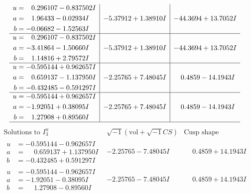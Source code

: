 \documentclass[1p]{elsarticle_modified}
\theoremstyle{definition}
\newcommand{\I}{\sqrt{-1}}
\begin{document}
$$\begin{array}{c|c|c}
\begin{aligned}
u &= \phantom{-}0.296107 - 0.837502 I \\
a &= \phantom{-}1.96433 - 0.02934 I \\
b &= -0.06682 - 1.52563 I\end{aligned}
 & -5.37912 + 1.38910 I & -44.3694 + 13.7052 I \\ \hline\begin{aligned}
u &= \phantom{-}0.296107 - 0.837502 I \\
a &= -3.41864 - 1.50660 I \\
b &= \phantom{-}1.14816 + 2.79572 I\end{aligned}
 & -5.37912 + 1.38910 I & -44.3694 + 13.7052 I \\ \hline\begin{aligned}
u &= -0.595144 + 0.962657 I \\
a &= \phantom{-}0.659137 - 1.137950 I \\
b &= -0.432485 - 0.591297 I\end{aligned}
 & -2.25765 + 7.48045 I & \phantom{-}0.4859 - 14.1943 I \\ \hline\begin{aligned}
u &= -0.595144 + 0.962657 I \\
a &= -1.92051 + 0.38095 I \\
b &= \phantom{-}1.27908 + 0.89560 I\end{aligned}
 & -2.25765 + 7.48045 I & \phantom{-}0.4859 - 14.1943 I\\
 \hline 
 \end{array}$$\newpage$$\begin{array}{c|c|c}  
\text{Solutions to }I^u_{3}& \I (\text{vol} + \sqrt{-1}CS) & \text{Cusp shape}\\
 \hline 
\begin{aligned}
u &= -0.595144 - 0.962657 I \\
a &= \phantom{-}0.659137 + 1.137950 I \\
b &= -0.432485 + 0.591297 I\end{aligned}
 & -2.25765 - 7.48045 I & \phantom{-}0.4859 + 14.1943 I \\ \hline\begin{aligned}
u &= -0.595144 - 0.962657 I \\
a &= -1.92051 - 0.38095 I \\
b &= \phantom{-}1.27908 - 0.89560 I\end{aligned}
 & -2.25765 - 7.48045 I & \phantom{-}0.4859 + 14.1943 I \\ \hline\begin{aligned}

\end{aligned}
\end{array}$$
\end{document}
